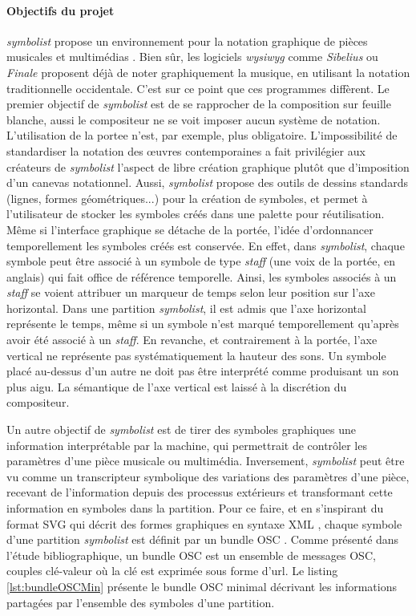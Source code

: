 \paragraph{Objectifs du projet} \textit{symbolist} propose un environnement pour la notation graphique de pièces musicales et multimédias \cite{gottfried2018}. Bien sûr, les logiciels \textit{wysiwyg} comme \textit{Sibelius} ou \textit{Finale} proposent déjà de noter graphiquement la musique, en utilisant la notation traditionnelle occidentale. C'est sur ce point que ces programmes diffèrent.
Le premier objectif de \textit{symbolist} est de se rapprocher de la composition sur feuille blanche, aussi le compositeur ne se voit imposer aucun système de notation. L'utilisation de la \gls{portee} n'est, par exemple, plus obligatoire.
L'impossibilité de standardiser la notation des œuvres contemporaines a fait privilégier aux créateurs de \textit{symbolist} l'aspect de libre création graphique plutôt que d'imposition d'un canevas notationnel.
Aussi, \textit{symbolist} propose des outils de dessins standards (lignes, formes géométriques...) pour la création de symboles, et permet à l'utilisateur de stocker les symboles créés dans une palette pour réutilisation.
Même si l'interface graphique se détache de la portée, l'idée d'ordonnancer temporellement les symboles créés est conservée. En effet, dans \textit{symbolist}, chaque symbole peut être associé à un symbole de type \textit{staff} (une voix de la portée, en anglais) qui fait office de référence temporelle. Ainsi, les symboles associés à un \textit{staff} se voient attribuer un marqueur de temps selon leur position sur l'axe horizontal. Dans une partition \textit{symbolist}, il est admis que l'axe horizontal représente le temps, même si un symbole n'est marqué temporellement qu'après avoir été associé à un \textit{staff}. En revanche, et contrairement à la portée, l'axe vertical ne représente pas systématiquement la hauteur des sons. Un symbole placé au-dessus d'un autre ne doit pas être interprété comme produisant un son plus aigu. La sémantique de l'axe vertical est laissé à la discrétion du compositeur.

Un autre objectif de \textit{symbolist} est de tirer des symboles graphiques une information interprétable par la machine, qui permettrait de contrôler les paramètres d'une pièce musicale ou multimédia. Inversement, \textit{symbolist} peut être vu comme un transcripteur symbolique des variations des paramètres d'une pièce, recevant de l'information depuis des processus extérieurs et transformant cette information en symboles dans la partition.   
Pour ce faire, et en s'inspirant du format SVG qui décrit des formes graphiques en syntaxe XML \cite{svg2011}, chaque symbole d'une partition \textit{symbolist} est définit par un bundle OSC \cite{wright2002}. Comme présenté dans l'étude bibliographique, un bundle OSC est un ensemble de messages OSC, couples clé-valeur où la clé est exprimée sous forme d'url.
Le listing \ref{lst:bundleOSCMin} présente le bundle OSC minimal décrivant les informations partagées par l'ensemble des symboles d'une partition.

